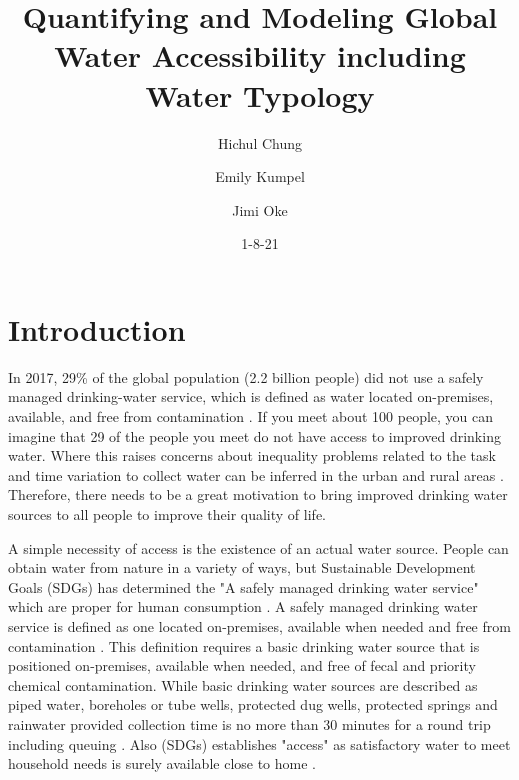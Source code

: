\documentclass[10pt,twoside]{article}
\numberwithin{equation}{section}
\newcommand{\?}{\stackrel{?}{=}}
\begin{document}
\vspace{-3ex}
\title{Quantifying and Modeling Global Water Accessibility including Water Typology}
\author{Hichul Chung \and Emily Kumpel \and Jimi Oke}
\date{1-8-21}
\maketitle



\section{Introduction}
In 2017, 29\% of the global population (2.2 billion people) did not use a safely managed drinking-water service, which is defined as water located on-premises, available, and free from contamination \citep{who2015drinkingwater}.   If you meet about 100 people, you can imagine that 29 of the people you meet do not have access to improved drinking water. Where this raises concerns about inequality problems related to the task and time variation 
to collect water can be inferred in the urban and rural areas \citep{cassivi2018access}. Therefore, there needs to be a
great motivation to bring improved drinking water sources to all people to improve their quality of life.

A simple necessity of access is the existence of an actual water source. People can obtain water from nature in a variety of ways, but Sustainable Development Goals (SDGs) has determined the "A safely managed drinking water service" which are proper for human consumption \citep{wssccWaterSanitationHygiene2014,who2015drinkingwater,goal}. A safely managed drinking water service is defined as one located on-premises, available when needed and free from contamination \citep{goal}. This definition requires a basic drinking water source that is positioned on-premises, available when needed, and free of fecal and priority chemical contamination. While basic drinking water sources are described as piped water, boreholes or
tube wells, protected dug wells, protected springs and rainwater provided collection time is no more than 30 minutes for
a round trip including queuing \citep{wssccWaterSanitationHygiene2014}. Also (SDGs) establishes "access" as satisfactory water to meet household needs is surely available close to home \citep{goal}.
\end{document}
